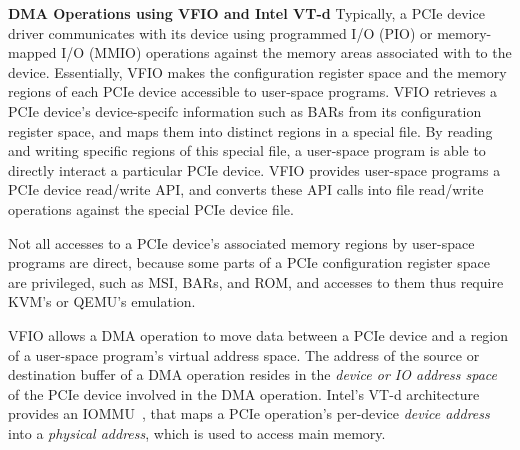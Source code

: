 {\bf DMA Operations using VFIO and Intel VT-d}
Typically, a PCIe device driver communicates with its device using programmed I/O (PIO) or
memory-mapped I/O (MMIO) operations against the memory areas associated with to the device. 
Essentially, VFIO makes the configuration register space and the memory regions of
each PCIe device accessible to user-space programs. 
VFIO retrieves a PCIe device's device-specifc information such as BARs from its
configuration register space, and maps them into distinct regions in a special file. 
By reading and writing specific regions of this special file, a user-space program 
is able to directly interact a particular PCIe device. 
VFIO provides user-space programs a PCIe device read/write API, and converts these API calls
into file read/write operations against the special PCIe device file.
%

Not all accesses to a PCIe device's associated memory regions by user-space programs are direct, 
because some parts of a PCIe configuration register space are privileged, such as MSI, BARs, and ROM,  and accesses to them 
thus require KVM's or QEMU's emulation. 

VFIO allows a DMA operation to move data between a PCIe device and 
a region of a user-space program's virtual address space.
The address of the source or destination buffer of a DMA operation resides in the {\em device or IO address space} of the PCIe device involved in the DMA operation.
Intel's VT-d architecture provides an IOMMU~\cite{ben:2006}, that maps a PCIe operation's per-device {\em device address} into a {\em physical address}, which is used to access main memory.
  
